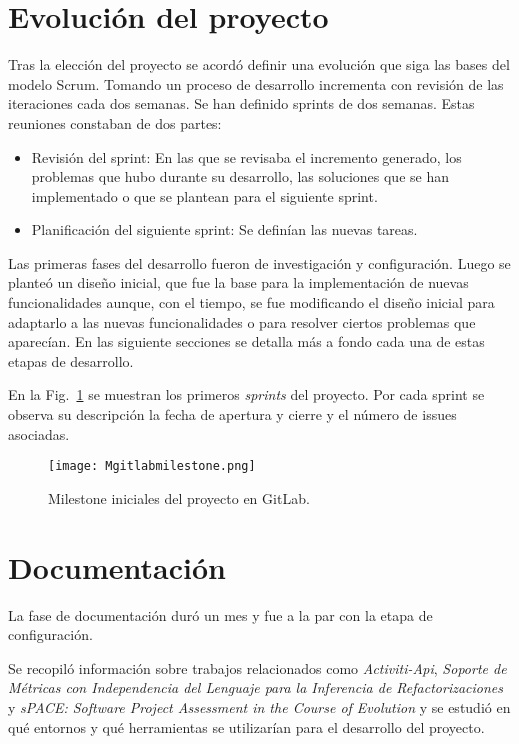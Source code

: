 \section{Evolución del proyecto}
Tras la elección del proyecto se acordó definir una evolución que siga las bases del modelo Scrum. Tomando un proceso de desarrollo incrementa con revisión de las iteraciones cada dos semanas.
Se han definido sprints de dos semanas. Estas reuniones constaban de dos partes:
\begin{itemize}
	\item Revisión del sprint: En las que se revisaba el incremento generado, los problemas que hubo durante su desarrollo, las soluciones que se han implementado o que se plantean para el siguiente sprint.
	\item Planificación del siguiente sprint: Se definían las nuevas tareas.
\end{itemize}
Las primeras fases del desarrollo fueron de investigación y configuración. Luego se planteó un diseño inicial, que fue la base para la implementación de nuevas funcionalidades aunque, con el tiempo, se fue modificando el diseño inicial para adaptarlo a las nuevas funcionalidades o para resolver ciertos problemas que aparecían. En las siguiente secciones se detalla más a fondo cada una de estas etapas de desarrollo.

En la Fig.~\ref{fig:Mgitlabmilestone} se muestran los primeros \textit{sprints} del proyecto. Por cada sprint se observa su descripción la fecha de apertura y cierre y el número de issues asociadas. 

\begin{figure}[!h]
	\centering
	\texttt{[image: Mgitlabmilestone.png]}
	\caption{Milestone iniciales del proyecto en GitLab.}
	\label{fig:Mgitlabmilestone}
\end{figure}

\section{Documentación}
La fase de documentación duró un mes y fue a la par con la etapa de configuración. 

Se recopiló información sobre trabajos relacionados como \textit{Activiti-Api}\cite{rlp0019_software_2019}, \textit{Soporte de Métricas con Independencia del Lenguaje para la Inferencia de Refactorizaciones} \cite{marticorena_soporte_2005} y \textit{sPACE: Software Project Assessment in the Course of Evolution} \cite{ratzinger_space:_2007} y se estudió en qué entornos y qué herramientas se utilizarían para el desarrollo del proyecto.

